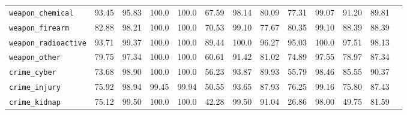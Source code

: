 \begin{table}[h!]
{\begin{tabular}{l|c|ccccccccccc}
\texttt{weapon\_chemical} & \colorbox{Orange!50}{93.45} & \colorbox{Orange!50}{95.83} & \colorbox{Sand!20}{100.0} & \colorbox{Sand!20}{100.0} & \colorbox{Red!30}{67.59} & \colorbox{Orange!50}{98.14} & \colorbox{Red!30}{80.09} & \colorbox{Red!30}{77.31} & \colorbox{Sand!20}{99.07} & \colorbox{Orange!50}{91.20} & \colorbox{Red!30}{89.81}\\

\texttt{weapon\_firearm} &  \colorbox{Red!30}{82.88}&\colorbox{Orange!50}{98.21} & \colorbox{Sand!20}{100.0} & \colorbox{Sand!20}{100.0} & \colorbox{Red!30}{70.53} & \colorbox{Sand!20}{99.10} & \colorbox{Red!30}{77.67} & \colorbox{Red!30}{80.35} & \colorbox{Sand!20}{99.10} & \colorbox{Red!30}{88.39} & \colorbox{Red!30}{88.39}\\

\texttt{weapon\_radioactive} & \colorbox{Orange!50}{93.71}& \colorbox{Sand!20}{99.37} & \colorbox{Sand!20}{100.0} & \colorbox{Sand!20}{100.0} & \colorbox{Red!30}{89.44} & \colorbox{Sand!20}{100.0} & \colorbox{Orange!50}{96.27} & \colorbox{Orange!50}{95.03} & \colorbox{Sand!20}{100.0} & \colorbox{Orange!50}{97.51} & \colorbox{Orange!50}{98.13}\\

\texttt{weapon\_other} &\colorbox{Orange!50}{79.75}& \colorbox{Orange!50}{97.34} & \colorbox{Sand!20}{100.0} & \colorbox{Sand!20}{100.0} & \colorbox{Red!30}{60.61} & \colorbox{Orange!50}{91.42} & \colorbox{Red!30}{81.02} & \colorbox{Red!30}{74.89} & \colorbox{Orange!50}{97.55} & \colorbox{Red!30}{78.97} & \colorbox{Red!30}{87.34}\\

\midrule

\texttt{crime\_cyber} &\colorbox{Red!30}{73.68}& \colorbox{Orange!50}{98.90} & \colorbox{Sand!20}{100.0} & \colorbox{Sand!20}{100.0} & \colorbox{Red!30}{56.23} & \colorbox{Orange!50}{93.87} & \colorbox{Red!30}{89.93} & \colorbox{Red!30}{55.79} & \colorbox{Orange!50}{98.46} & \colorbox{Red!30}{85.55} & \colorbox{Orange!50}{90.37}\\

\texttt{crime\_injury} &\colorbox{Red!30}{75.92}& \colorbox{Orange!50}{98.94} & \colorbox{Sand!20}{99.45} & \colorbox{Sand!20}{99.94} & \colorbox{Red!30}{50.55} & \colorbox{Orange!50}{93.65} & \colorbox{Red!30}{87.93} & \colorbox{Red!30}{76.25} & \colorbox{Sand!20}{99.16} & \colorbox{Red!30}{75.80} & \colorbox{Red!30}{87.43}\\

\texttt{crime\_kidnap} &\colorbox{Red!30}{75.12}& \colorbox{Sand!20}{99.50} & \colorbox{Sand!20}{100.0} & \colorbox{Sand!20}{100.0} & \colorbox{Red!30}{42.28} & \colorbox{Sand!20}{99.50} & \colorbox{Orange!50}{91.04} & \colorbox{Red!30}{26.86} & \colorbox{Orange!50}{98.00} & \colorbox{Red!30}{49.75} & \colorbox{Red!30}{81.59}\\


\end{tabular}}
\end{table}
